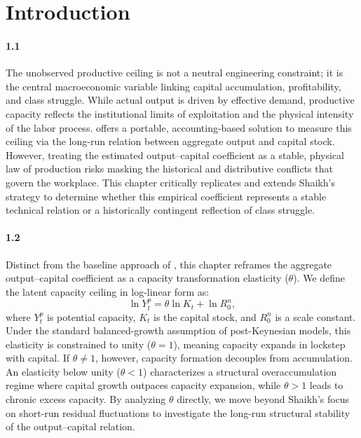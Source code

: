 \section{Introduction}
\label{sec:introduction}
\paragraph{1.1}
The unobserved productive ceiling is not a neutral engineering constraint; it is the central macroeconomic variable linking capital accumulation, profitability, and class struggle. While actual output is driven by effective demand, productive capacity reflects the institutional limits of exploitation and the physical intensity of the labor process. \citet{Shaikh2016} offers a portable, accounting-based solution to measure this ceiling via the long-run relation between aggregate output and capital stock. However, treating the estimated output–capital coefficient as a stable, physical law of production risks masking the historical and distributive conflicts that govern the workplace. This chapter critically replicates and extends Shaikh’s strategy to determine whether this empirical coefficient represents a stable technical relation or a historically contingent reflection of class struggle.

\paragraph{1.2}
Distinct from the baseline approach of \citet{Shaikh2016}, this chapter reframes the aggregate output–capital coefficient as a capacity transformation elasticity ($\theta$). We define the latent capacity ceiling in log-linear form as:
\begin{equation}
\ln Y^p_t = \theta \ln K_t + \ln R^n_0,
\end{equation}
where $Y^p_t$ is potential capacity, $K_t$ is the capital stock, and $R^n_0$ is a scale constant. Under the standard balanced-growth assumption of post-Keynesian models, this elasticity is constrained to unity ($\theta = 1$), meaning capacity expands in lockstep with capital. If $\theta \neq 1$, however, capacity formation decouples from accumulation. An elasticity below unity ($\theta < 1$) characterizes a structural overaccumulation regime where capital growth outpaces capacity expansion, while $\theta > 1$ leads to chronic excess capacity. By analyzing $\theta$ directly, we move beyond Shaikh’s focus on short-run residual fluctuations to investigate the long-run structural stability of the output–capital relation.

